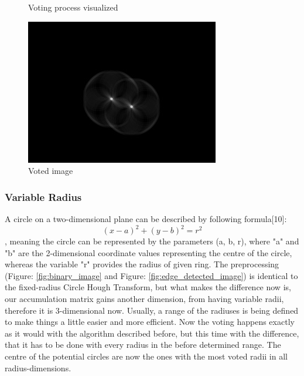 \begin{figure}[H]
	\caption{Voting process visualized\protect\footnotemark}\label{fig:circlehough_explanation}
	\endminipage
	\hfill
	\includegraphics[width=\linewidth]{images/hough_circle.jpg}
	\caption{Voted image\protect\footnotemark}\label{fig:voted_image}
	\endminipage
	
\end{figure}
\setcounter{footnote}{2}
\setcounter{footnote}{3}
\setcounter{footnote}{4}
\setcounter{footnote}{5}

\subsubsection{Variable Radius}
A circle on a two-dimensional plane can be described by following formula[10]: \[ (x - a)^2 + (y - b)^2 = r^2  \]
, meaning the circle can be represented by the parameters (a, b, r), where "a" and "b" are the 2-dimensional coordinate values representing the centre of the circle, whereas the variable "r" provides the radius of given ring. \newline
The preprocessing (Figure: \ref{fig:binary_image} and Figure: \ref{fig:edge_detected_image}) is identical to the fixed-radius Circle Hough Transform, but what makes the difference now is, our accumulation matrix gains another dimension, from having variable radii, therefore it is 3-dimensional now. Usually, a range of the radiuses is being defined to make things a little easier and more efficient. Now the voting happens exactly as it would with the algorithm described before, but this time with the difference, that it has to be done with every radius in the before determined range. The centre of the potential circles are now the ones with the most voted radii in all radius-dimensions.

